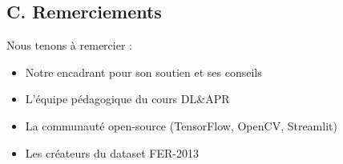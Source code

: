 \documentclass[12pt,a4paper]{article}
\begin{document}
\subsection*{C. Remerciements}

Nous tenons à remercier :
\begin{itemize}
    \item Notre encadrant pour son soutien et ses conseils
    \item L'équipe pédagogique du cours DL\&APR
    \item La communauté open-source (TensorFlow, OpenCV, Streamlit)
    \item Les créateurs du dataset FER-2013
\end{itemize}
\end{document}
